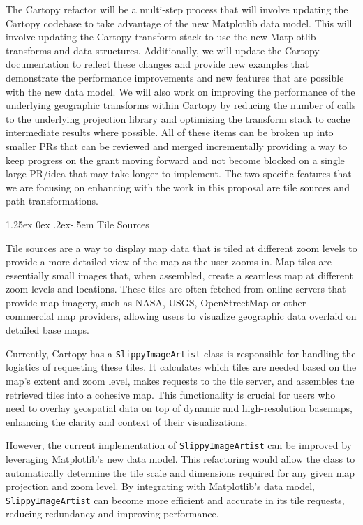 \documentclass[12pt]{article}
\makeatletter
\numberwithin{page}{section}
\renewcommand{\paragraph}{%
  \@startsection{paragraph}{4}%
  {\z@}{1.25ex \@plus 0ex \@minus .2ex}{-.5em}%
  {\normalfont\normalsize\itshape\bfseries}%
}
\makeatother
\begin{document}
The Cartopy refactor will be a multi-step process that will involve updating the
Cartopy codebase to take advantage of the new Matplotlib data model. This will
involve updating the Cartopy transform stack to use the new Matplotlib transforms
and data structures. Additionally, we will update the Cartopy documentation to
reflect these changes and provide new examples that demonstrate the performance
improvements and new features that are possible with the new data model. We will
also work on improving the performance of the underlying geographic transforms within Cartopy
by reducing the number of calls to the underlying projection library and optimizing
the transform stack to cache intermediate results where possible. All of these items
can be broken up into smaller PRs that can be reviewed and merged incrementally providing
a way to keep progress on the grant moving forward and not become blocked on a single
large PR/idea that may take longer to implement. The two specific features that we are
focusing on enhancing with the work in this proposal are tile sources and path transformations.

\paragraph{Tile Sources}

Tile sources are a way to display map data that is
tiled at different zoom levels to provide a more detailed view of the map as the user zooms
in. Map tiles are essentially small images that, when assembled, create a seamless map at
different zoom levels and locations. These tiles are often fetched from online servers
that provide map imagery, such as NASA, USGS, OpenStreetMap or other commercial map providers,
allowing users to visualize geographic data overlaid on detailed base maps.

Currently, Cartopy has a \texttt{SlippyImageArtist} class is responsible for handling the
logistics of requesting these tiles. It calculates which tiles are needed based on the
map's extent and zoom level, makes requests to the tile server, and assembles the retrieved
tiles into a cohesive map. This functionality is crucial for users who need to overlay geospatial
data on top of dynamic and high-resolution basemaps, enhancing the clarity and context of
their visualizations.

However, the current implementation of \texttt{SlippyImageArtist} can be improved by leveraging
Matplotlib's new data model. This refactoring would allow the class to automatically determine
the tile scale and dimensions required for any given map projection and zoom level. By integrating
with Matplotlib's data model, \texttt{SlippyImageArtist} can become more efficient and accurate in
its tile requests, reducing redundancy and improving performance.
\end{document}
